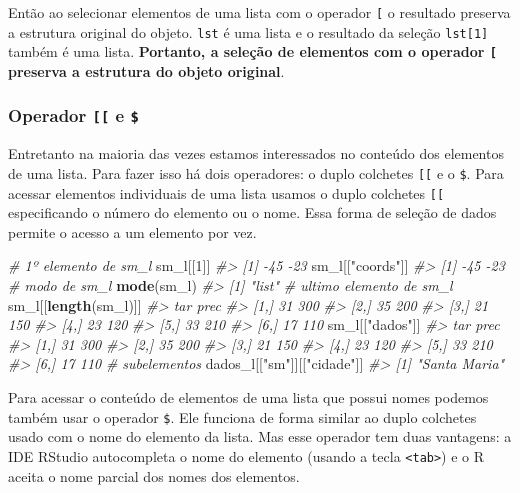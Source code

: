\documentclass[]{book}
\newenvironment{Shaded}{\begin{snugshade}}{\end{snugshade}}
\newcommand{\KeywordTok}[1]{\textcolor[rgb]{0.13,0.29,0.53}{\textbf{#1}}}
\newcommand{\DecValTok}[1]{\textcolor[rgb]{0.00,0.00,0.81}{#1}}
\newcommand{\StringTok}[1]{\textcolor[rgb]{0.31,0.60,0.02}{#1}}
\newcommand{\CommentTok}[1]{\textcolor[rgb]{0.56,0.35,0.01}{\textit{#1}}}
\newcommand{\NormalTok}[1]{#1}
\begin{document}
Então ao selecionar elementos de uma lista com o operador \texttt{{[}} o
resultado preserva a estrutura original do objeto. \texttt{lst} é uma
lista e o resultado da seleção \texttt{lst{[}1{]}} também é uma lista.
\textbf{Portanto, a seleção de elementos com o operador \texttt{{[}}
preserva a estrutura do objeto original}.

\subsubsection{\texorpdfstring{Operador \texttt{{[}{[}} e
\texttt{\$}}{Operador {[}{[} e \$}}\label{operador-e}

Entretanto na maioria das vezes estamos interessados no conteúdo dos
elementos de uma lista. Para fazer isso há dois operadores: o duplo
colchetes \texttt{{[}{[}} e o \texttt{\$}. Para acessar elementos
individuais de uma lista usamos o duplo colchetes \texttt{{[}{[}}
especificando o número do elemento ou o nome. Essa forma de seleção de
dados permite o acesso a um elemento por vez.

\begin{Shaded}
\begin{Highlighting}[]
\CommentTok{# 1º elemento de sm_l}
\NormalTok{sm_l[[}\DecValTok{1}\NormalTok{]]}
\CommentTok{#> [1] -45 -23}
\NormalTok{sm_l[[}\StringTok{"coords"}\NormalTok{]]}
\CommentTok{#> [1] -45 -23}
\CommentTok{# modo de sm_l}
\KeywordTok{mode}\NormalTok{(sm_l)}
\CommentTok{#> [1] "list"}
\CommentTok{# ultimo elemento de sm_l}
\NormalTok{sm_l[[}\KeywordTok{length}\NormalTok{(sm_l)]]}
\CommentTok{#>      tar prec}
\CommentTok{#> [1,]  31  300}
\CommentTok{#> [2,]  35  200}
\CommentTok{#> [3,]  21  150}
\CommentTok{#> [4,]  23  120}
\CommentTok{#> [5,]  33  210}
\CommentTok{#> [6,]  17  110}
\NormalTok{sm_l[[}\StringTok{"dados"}\NormalTok{]]}
\CommentTok{#>      tar prec}
\CommentTok{#> [1,]  31  300}
\CommentTok{#> [2,]  35  200}
\CommentTok{#> [3,]  21  150}
\CommentTok{#> [4,]  23  120}
\CommentTok{#> [5,]  33  210}
\CommentTok{#> [6,]  17  110}
\CommentTok{# subelementos}
\NormalTok{dados_l[[}\StringTok{"sm"}\NormalTok{]][[}\StringTok{"cidade"}\NormalTok{]]}
\CommentTok{#> [1] "Santa Maria"}
\end{Highlighting}
\end{Shaded}

Para acessar o conteúdo de elementos de uma lista que possui nomes
podemos também usar o operador \texttt{\$}. Ele funciona de forma
similar ao duplo colchetes usado com o nome do elemento da lista. Mas
esse operador tem duas vantagens: a IDE RStudio autocompleta o nome do
elemento (usando a tecla \texttt{\textless{}tab\textgreater{}}) e o R
aceita o nome parcial dos nomes dos elementos.
\end{document}
